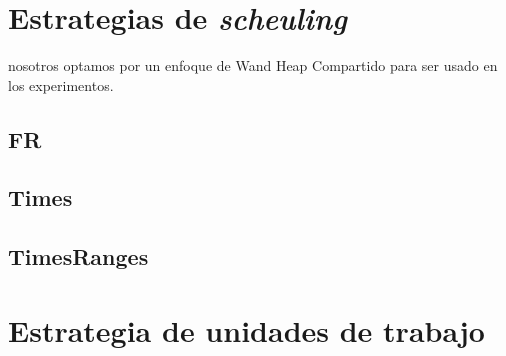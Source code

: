 \section{Estrategias de \textit{scheuling}}
\label{scheduling:es}
nosotros optamos por un enfoque de Wand Heap Compartido para ser usado en los experimentos.
\subsection{FR}
\label{scheduling:fr}

\subsection{Times}
\label{scheduling:times}

\subsection{TimesRanges}
\label{scheduling:timesranges}




\section{Estrategia de unidades de trabajo}
\label{scheduling:unidadestrabajo}